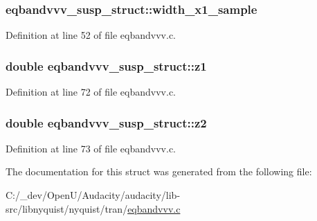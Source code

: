 \subsubsection[{\texorpdfstring{width\+\_\+x1\+\_\+sample}{width_x1_sample}}]{ eqbandvvv\+\_\+susp\+\_\+struct\+::width\+\_\+x1\+\_\+sample}\hypertarget{structeqbandvvv__susp__struct_a51cbea47172265c5d359ab3c07a4a5b6}{}\label{structeqbandvvv__susp__struct_a51cbea47172265c5d359ab3c07a4a5b6}


Definition at line 52 of file eqbandvvv.\+c.

\subsubsection[{\texorpdfstring{z1}{z1}}]{\setlength{\rightskip}{0pt plus 5cm}double eqbandvvv\+\_\+susp\+\_\+struct\+::z1}\hypertarget{structeqbandvvv__susp__struct_a0a7745485696a2af5bcd0cd35c28b2dd}{}\label{structeqbandvvv__susp__struct_a0a7745485696a2af5bcd0cd35c28b2dd}


Definition at line 72 of file eqbandvvv.\+c.

\subsubsection[{\texorpdfstring{z2}{z2}}]{\setlength{\rightskip}{0pt plus 5cm}double eqbandvvv\+\_\+susp\+\_\+struct\+::z2}\hypertarget{structeqbandvvv__susp__struct_aa40fcc62e1a542cbb3c7146dbd25351d}{}\label{structeqbandvvv__susp__struct_aa40fcc62e1a542cbb3c7146dbd25351d}


Definition at line 73 of file eqbandvvv.\+c.



The documentation for this struct was generated from the following file\+:\begin{DoxyCompactItemize}
\item 
C\+:/\+\_\+dev/\+Open\+U/\+Audacity/audacity/lib-\/src/libnyquist/nyquist/tran/\hyperlink{eqbandvvv_8c}{eqbandvvv.\+c}\end{DoxyCompactItemize}
